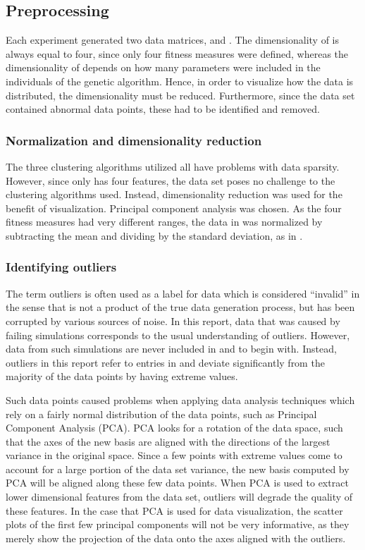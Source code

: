 \subsection{Preprocessing}
Each experiment generated two data matrices, \datamatrixfit{}{} and \datamatrixpar{}. The dimensionality of \datamatrixfit{} is always equal to four, since only four fitness measures were defined, whereas the dimensionality of \datamatrixpar{}{} depends on how many parameters were included in the individuals of the genetic algorithm. Hence, in order to visualize how the data is distributed, the dimensionality must be reduced. Furthermore, since the data set contained abnormal data points, these had to be identified and removed.


\subsubsection{Normalization and dimensionality reduction}
The three clustering algorithms utilized all have problems with data sparsity. However, since \datamatrixfit{} only has four features, the data set poses no challenge to the clustering algorithms used. Instead, dimensionality reduction was used for the benefit of visualization. Principal component analysis was chosen. As the four fitness measures had very different ranges, the data in \datamatrixfit{} was normalized by subtracting the mean and dividing by the standard deviation, as in \cite{salkind2010encyclopedia}.

\subsubsection{Identifying outliers}\label{section:outliers}
The term outliers is often used as a label for data which is considered ``invalid'' in the sense that is not a product of the true data generation process, but has been corrupted by various sources of noise. In this report, data that was caused by failing simulations corresponds to the usual understanding of outliers. However, data from such simulations are never included in \datamatrixpar{} and \datamatrixfit{} to begin with. Instead, outliers in this report refer to entries in \datamatrixpar{} and \datamatrixfit{}  deviate significantly from the majority of the data points by having extreme values.

Such data points caused problems when applying data analysis techniques which rely on a fairly normal distribution of the data points, such as Principal Component Analysis (PCA). PCA looks for a rotation of the data space, such that the axes of the new basis are aligned with the directions of the largest variance in the original space. Since a few points with extreme values come to account for a large portion of the data set variance, the new basis computed by PCA will be aligned along these few data points. When PCA is used to extract lower dimensional features from the data set, outliers will degrade the quality of these features. In the case that PCA is used for data visualization, the scatter plots of the first few principal components will not be very informative, as they merely show the projection of the data onto the axes aligned with the outliers.

